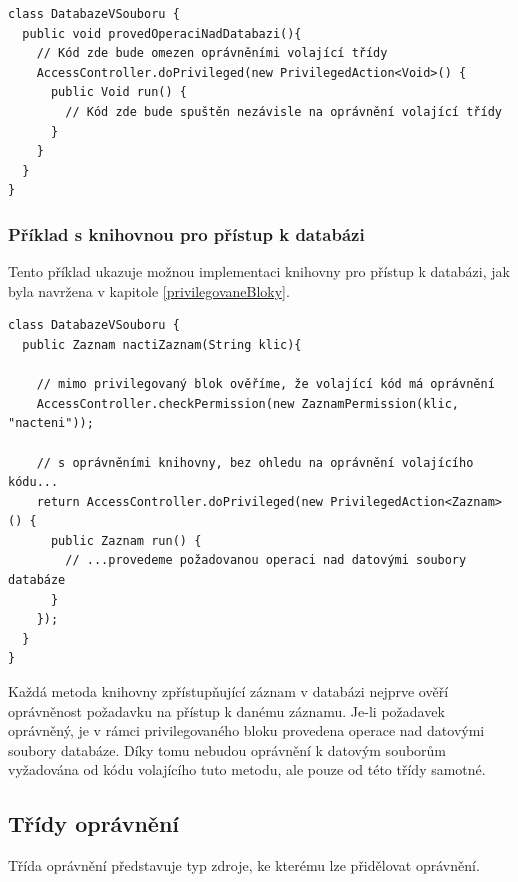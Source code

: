 \begin{verbatim}
class DatabazeVSouboru {
  public void provedOperaciNadDatabazi(){
    // Kód zde bude omezen oprávněními volající třídy
    AccessController.doPrivileged(new PrivilegedAction<Void>() {
      public Void run() {
        // Kód zde bude spuštěn nezávisle na oprávnění volající třídy
      }
    }
  }
}
\end{verbatim}

\subsubsection{Příklad s knihovnou pro přístup k databázi}\label{databazeVsouboru}

Tento příklad ukazuje možnou implementaci knihovny pro přístup k databázi, jak byla navržena v kapitole \ref{privilegovaneBloky}.

\begin{verbatim}
class DatabazeVSouboru {
  public Zaznam nactiZaznam(String klic){
    
    // mimo privilegovaný blok ověříme, že volající kód má oprávnění
    AccessController.checkPermission(new ZaznamPermission(klic, "nacteni"));
    
    // s oprávněními knihovny, bez ohledu na oprávnění volajícího kódu...
    return AccessController.doPrivileged(new PrivilegedAction<Zaznam>() {
      public Zaznam run() {
        // ...provedeme požadovanou operaci nad datovými soubory databáze
      }
    });
  }
}
\end{verbatim}

Každá metoda knihovny zpřístupňující záznam v databázi nejprve ověří oprávněnost požadavku na přístup k danému záznamu.
Je-li požadavek oprávněný, je v rámci privilegovaného bloku provedena operace nad datovými soubory databáze.
Díky tomu nebudou oprávnění k datovým souborům vyžadována od kódu volajícího tuto metodu, ale pouze od této třídy samotné.

\subsection{Třídy oprávnění}

Třída oprávnění představuje typ zdroje, ke kterému lze přidělovat oprávnění.


